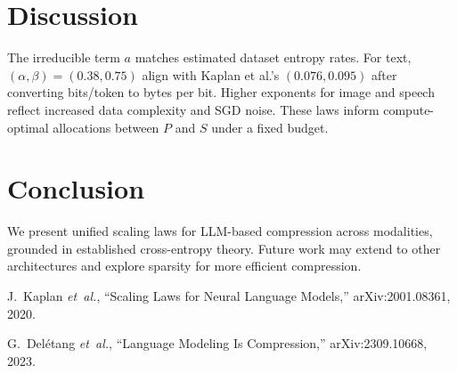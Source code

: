 \documentclass{article}
\begin{document}
\section{Discussion}
The irreducible term $a$ matches estimated dataset entropy rates. For text, $(\alpha,\beta)=(0.38,0.75)$ align with Kaplan et al.’s $(0.076,0.095)$ after converting bits/token to bytes per bit. Higher exponents for image and speech reflect increased data complexity and SGD noise. These laws inform compute-optimal allocations between $P$ and $S$ under a fixed budget.

\section{Conclusion}
We present unified scaling laws for LLM-based compression across modalities, grounded in established cross-entropy theory. Future work may extend to other architectures and explore sparsity for more efficient compression.

\begin{thebibliography}{9}
J.~Kaplan \emph{et~al.}, 
``Scaling Laws for Neural Language Models,'' 
arXiv:2001.08361, 2020.

G.~Del\'etang \emph{et~al.}, 
``Language Modeling Is Compression,'' 
arXiv:2309.10668, 2023.
\end{thebibliography}
\end{document}
